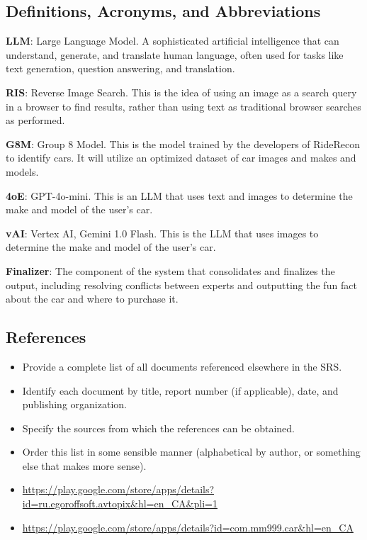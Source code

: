 \documentclass[]{article}
\begin{document}
\subsection{Definitions, Acronyms, and Abbreviations}
\label{sub:definitions_acronyms_and_abbreviations}
\textbf{LLM}: Large Language Model. A sophisticated artificial intelligence that can understand, generate, and translate human language, often used for tasks like text generation, question answering, and translation.

\textbf{RIS}: Reverse Image Search. This is the idea of using an image as a search query in a browser to find results, rather than using text as traditional browser searches as performed.

\textbf{G8M}: Group 8 Model. This is the model trained by the developers of RideRecon to identify cars. It will utilize an optimized dataset of car images and makes and models.

\textbf{4oE}: GPT-4o-mini. This is an LLM that uses text and images to determine the make and model of the user's car.

\textbf{vAI}: Vertex AI, Gemini 1.0 Flash. This is the LLM that uses images to determine the make and model of the user's car.

\textbf{Finalizer}: The component of the system that consolidates and finalizes the output, including resolving conflicts between experts and outputting the fun fact about the car and where to purchase it.

\subsection{References}
\label{sub:references}
\begin{itemize}
    \item Provide a complete list of all documents referenced elsewhere in the SRS.
    \item Identify each document by title, report number (if applicable), date, and publishing organization.
    \item Specify the sources from which the references can be obtained.
    \item Order this list in some sensible manner (alphabetical by author, or something else that makes more sense).
\end{itemize}

\begin{itemize}
    \item \url{https://play.google.com/store/apps/details?id=ru.egoroffsoft.avtopix&hl=en_CA&pli=1}
    \item \url{https://play.google.com/store/apps/details?id=com.mm999.car&hl=en_CA}
\end{itemize}
\end{document}

